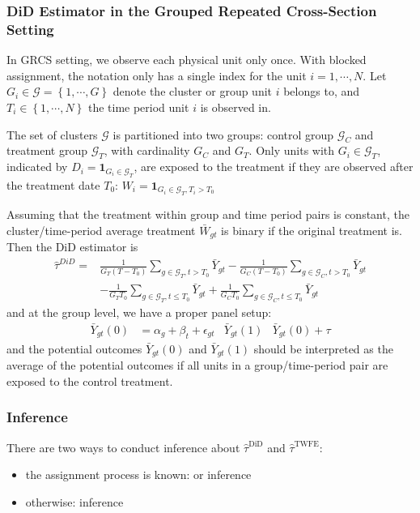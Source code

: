 \documentclass[twoside]{article}
\begin{document}
\subsubsection{DiD Estimator in the Grouped Repeated Cross-Section Setting}
In GRCS setting, we observe each physical unit only once. With blocked assignment, the notation only has a single index for the unit $i=1,\cdots,N$.
Let $G_i\in\mathcal{G}=\left\{1,\cdots,G\right\}$ denote the cluster or group unit $i$ belongs to, and $T_i\in \left\{1,\cdots,N\right\}$ the time period unit $i$ is observed in.

The set of clusters $\mathcal{G}$ is partitioned into two groups: control group $\mathcal{G}_C$ and treatment group $\mathcal{G}_T$, with cardinality $G_C$ and $G_T$. Only units with $G_i\in \mathcal{G}_T$, indicated by $D_i=\mathbf{1}_{G_i\in\mathcal{G}_T}$, are exposed to the treatment if they are observed after the treatment date $T_0$: $W_i=\mathbf{1}_{G_i\in\mathcal{G}_T,T_i>T_0}$

Assuming that the treatment within group and time period pairs is constant, the cluster/time-period average treatment $\bar{W}_{gt}$ is binary if the original treatment is. Then the DiD estimator is 
\begin{align*}
    \hat{\tau}^{DiD} =& \frac{1}{G_T\left(T-T_0\right)} \sum_{g\in\mathcal{G}_T,t>T_0} \bar{Y}_{gt} - \frac{1}{G_C\left(T-T_0\right)} \sum_{g\in\mathcal{G}_C,t>T_0}\bar{Y}_{gt}\\
    &- \frac{1}{G_TT_0}\sum_{g\in\mathcal{G}_T,t\leq T_0} \bar{Y}_{gt} + \frac{1}{G_CT_0}\sum_{g\in\mathcal{G}_C,t\leq T_0}\bar{Y}_{gt}
\end{align*}
and at the group level, we have a proper panel setup:
\begin{align*}
    \bar{Y}_{gt}(0) &= \alpha_g+\beta_t+\epsilon_{gt} & \bar{Y}_{gt}(1) &\bar{Y}_{gt}(0)+\tau
\end{align*}
and the potential outcomes $\bar{Y}_{gt}(0)$ and $\bar{Y}_{gt}(1)$ should be interpreted as the average of the potential outcomes if all units in a group/time-period pair are exposed to the control treatment.

\subsubsection{Inference}
There are two ways to conduct inference about $\hat{\tau}^{\mathrm{DiD}}$ and $\hat{\tau}^{\mathrm{TWFE}}$:
\begin{itemize}
    \item the assignment process is known:  or  inference
    \item otherwise:  inference
\end{itemize}
\end{document}
